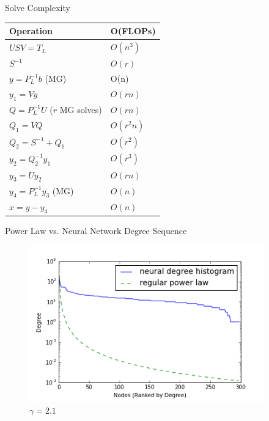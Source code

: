 \documentclass[xcolor=dvipsnames,10pt]{beamer}
\begin{document}
\begin{frame}{Solve Complexity}
\begin{center}
\renewcommand{\arraystretch}{1.5}
    \begin{tabular}{ | l | l |}
    \hline
    \textbf{Operation} & \textbf{O(FLOPs)} \\ \hline
    $USV = T_L$ & $O(n^3)$ \\ \hline
    $S^{-1}$ & $O(r)$ \\ \hline
    $y = P_L^{-1}b$ (MG) & O(n)  \\  \hline
    $y_1 = Vy$ & $O(rn)$ \\ \hline
    $Q = P_L^{-1}U$ ($r$ MG solves) & $O(rn)$ \\ \hline
    $Q_1 = VQ$ & $O(r^2 n)$ \\ \hline
    $Q_2 = S^{-1} + Q_1$ & $O(r^2)$ \\ \hline
    $y_2 = Q_2^{-1}y_1$ & $O(r^3)$ \\ \hline
    $y_3 = Uy_2$ & $O(rn)$ \\ \hline
    $y_4 = P_L^{-1}y_3$ (MG) & $O(n)$ \\ \hline
    $x = y - y_4$ & $O(n)$ \\
    \hline
    \end{tabular}
\end{center}
\end{frame}

\begin{frame}{Power Law vs. Neural Network Degree Sequence}


\begin{figure}
\begin{center}
\includegraphics[width=4in]{neuralsequenceplot2.png}
  \caption{$\gamma = 2.1$}
  \end{center}
  \end{figure}

\end{frame}
\end{document}

